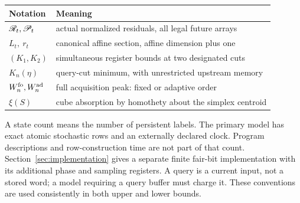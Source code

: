 \begin{center}
\begin{tabular}{@{}ll@{}}
\toprule
Notation & Meaning \\
\midrule
$\mathscr R_t,\mathscr P_t$ & actual normalized residuals, all legal future arrays \\
$L_t,\ r_t$ & canonical affine section, affine dimension plus one \\
$(K_1,K_2)$ & simultaneous register bounds at two designated cuts \\
$K_n(\eta)$ & query-cut minimum, with unrestricted upstream memory \\
$W_n^{\rm fo},W_n^{\rm ad}$ & full acquisition peak: fixed or adaptive order \\
$\xi(S)$ & cube absorption by homothety about the simplex centroid \\
\bottomrule
\end{tabular}
\end{center}
A state count means the number of persistent labels. The primary model
has exact atomic stochastic rows and an externally declared clock.
Program descriptions and row-construction time are not part of that
count. Section~\ref{sec:implementation} gives a separate finite fair-bit
implementation with its additional phase and sampling registers. A query
is a current input, not a stored word; a model requiring a query buffer
must charge it. These conventions are used consistently in both upper
and lower bounds.
